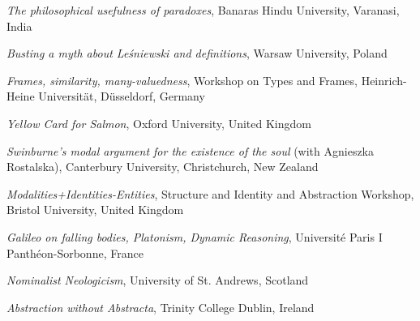 \documentclass[10pt, a4paper]{article}
\newcommand{\years}[1]{\marginnote{\normalsize #1}}
\begin{document}
\vspace{0.5mm}


\emph{The philosophical usefulness of paradoxes},  Banaras Hindu University, Varanasi, India



\vspace{0.5mm}

 \emph{Busting a myth about Le\' sniewski and definitions},  Warsaw University, Poland


\vspace{0.5mm}





\years{2010} \emph{Frames, similarity, many-valuedness}, Workshop on Types and Frames,    Heinrich-Heine Universit\"at, D\"usseldorf, Germany



\vspace{0.5mm}

   
\emph{Yellow Card for Salmon},   Oxford University, United Kingdom


\vspace{0.5mm}


  \emph{Swinburne's modal argument for the existence of the soul} (with Agnieszka Rostalska),  Canterbury University, Christchurch, New Zealand



\vspace{0.5mm}



\years{2009} \emph{Modalities+Identities-Entities}, Structure and Identity and Abstraction Workshop,      Bristol University, United Kingdom



\vspace{0.5mm}

\emph{Galileo on falling bodies, Platonism, Dynamic Reasoning}, Universit\'e  Paris I Panth\'eon-Sorbonne, France





\vspace{0.5mm}

 \emph{Nominalist   Neologicism},  University of St. Andrews, Scotland


\vspace{0.5mm}

\emph{Abstraction without Abstracta},    Trinity College Dublin, Ireland


\vspace{0.5mm}
\end{document}
